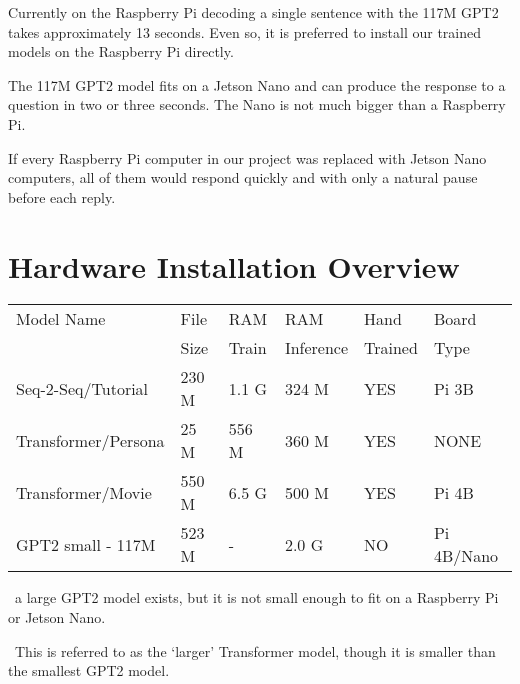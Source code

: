 Currently on the Raspberry Pi decoding a single sentence with the 117M GPT2 takes approximately 13 seconds. Even so, it is preferred to install our trained models on the Raspberry Pi directly.

The 117M GPT2 model fits on a Jetson Nano and can produce the response to a question in two or three seconds. The Nano is not much bigger than a Raspberry Pi.

If every Raspberry Pi computer in our project was replaced with Jetson Nano computers, all of them would respond quickly and with only a natural pause before each reply.

\section{Hardware Installation Overview}



\begin{table}[h]
	
	\begin{center}
		
		
		\begin{tabular}{llllll}
			
			Model Name    & File  & RAM  & RAM    & Hand & Board \\
			&  Size & Train   & Inference    & Trained &   Type \\
			\hline
			\hline
			Seq-2-Seq/Tutorial & 230 M     & 1.1 G & 324 M             & YES  &  Pi 3B \\
			Transformer/Persona   & 25 M      & 556 M & 360 M          & YES  & NONE \\
			Transformer/Movie \dag \dag  & 550 M      & 6.5 G & 500 M  & YES    & Pi 4B  \\
			GPT2 small - 117M \dag   & 523 M  & -   & 2.0 G         & NO     &  Pi 4B/Nano \\
			\hline
		\end{tabular}
		
		\bigskip
	\end{center}
		\dag \ a large GPT2 model exists, but it is not small enough to fit on a Raspberry Pi or Jetson Nano.
		
		\dag \dag \ This is referred to as the `larger' Transformer model, though it is smaller than the smallest GPT2 model.
		
	
	\label{fig:modeloverview}
\end{table}


